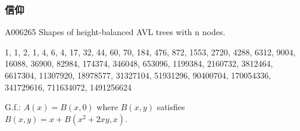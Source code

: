 \subsubsection{信仰}
A006265 		Shapes of height-balanced AVL trees with n nodes.

1, 1, 2, 1, 4, 6, 4, 17, 32, 44, 60, 70, 184, 476, 872, 1553, 2720, 4288, 6312, 9004, 16088, 36900, 82984, 174374, 346048, 653096, 1199384, 2160732, 3812464, 6617304, 11307920, 18978577, 31327104, 51931296, 90400704, 170054336, 341729616, 711634072, 1491256624

G.f.: $A(x) = B(x,0)$ where $B(x,y)$ satisfies $B(x,y) = x + B(x^2+2xy,x)$.
